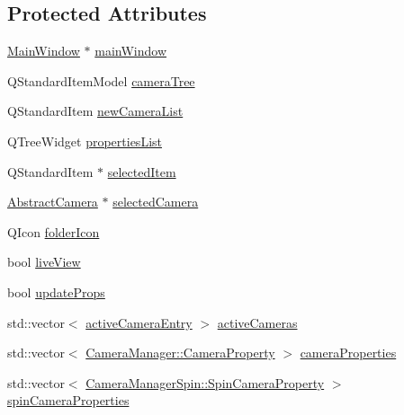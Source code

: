 \subsection*{Protected Attributes}
\begin{DoxyCompactItemize}
\item 
\mbox{\hyperlink{class_main_window}{Main\+Window}} $\ast$ \mbox{\hyperlink{class_abstract_camera_manager_a4da500120930cd1b916dda0c00a6644d}{main\+Window}}
\item 
Q\+Standard\+Item\+Model \mbox{\hyperlink{class_abstract_camera_manager_a9b502f3e4d39972a14172735eeed4257}{camera\+Tree}}
\item 
Q\+Standard\+Item \mbox{\hyperlink{class_abstract_camera_manager_aabb32afc5e43c72a43cda751c0545314}{new\+Camera\+List}}
\item 
Q\+Tree\+Widget \mbox{\hyperlink{class_abstract_camera_manager_a1cbe78ef302f1ca371515b337d6c4cb0}{properties\+List}}
\item 
Q\+Standard\+Item $\ast$ \mbox{\hyperlink{class_abstract_camera_manager_a82d1d50b12a4fc2a8647c503df60d08d}{selected\+Item}}
\item 
\mbox{\hyperlink{class_abstract_camera}{Abstract\+Camera}} $\ast$ \mbox{\hyperlink{class_abstract_camera_manager_aa6e71b6a58aecadf7c5f329e097f417a}{selected\+Camera}}
\item 
Q\+Icon \mbox{\hyperlink{class_abstract_camera_manager_a990953dbac1ef8b82c661236f6222e40}{folder\+Icon}}
\item 
bool \mbox{\hyperlink{class_abstract_camera_manager_a6d123827ae872e0cd681f515aac2661b}{live\+View}}
\item 
bool \mbox{\hyperlink{class_abstract_camera_manager_a204492d1767bbf1c6cdfa7b145c41429}{update\+Props}}
\item 
std\+::vector$<$ \mbox{\hyperlink{struct_abstract_camera_manager_1_1active_camera_entry}{active\+Camera\+Entry}} $>$ \mbox{\hyperlink{class_abstract_camera_manager_a6487a5d1471603bd4c9cd18ff953813d}{active\+Cameras}}
\item 
std\+::vector$<$ \mbox{\hyperlink{class_camera_manager_1_1_camera_property}{Camera\+Manager\+::\+Camera\+Property}} $>$ \mbox{\hyperlink{class_abstract_camera_manager_af11e8e49cfd447f24db39409522896a7}{camera\+Properties}}
\item 
std\+::vector$<$ \mbox{\hyperlink{class_camera_manager_spin_1_1_spin_camera_property}{Camera\+Manager\+Spin\+::\+Spin\+Camera\+Property}} $>$ \mbox{\hyperlink{class_abstract_camera_manager_a259e5562b28f304fa3d84c4b85bead45}{spin\+Camera\+Properties}}
\end{DoxyCompactItemize}



